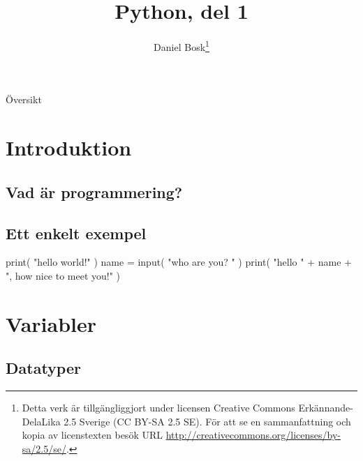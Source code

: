 \documentclass{beamer}
\title{%
  Python, del 1
}
\author{Daniel Bosk\footnote{%
  \tiny
  Detta verk är tillgängliggjort under licensen Creative Commons 
  Erkännande-DelaLika 2.5 Sverige (CC BY-SA 2.5 SE).
  För att se en sammanfattning och kopia av licenstexten besök URL 
  \url{http://creativecommons.org/licenses/by-sa/2.5/se/}.
}}
\institute[MIUN IKS]{%
  Avdelningen för informations- och kommunikationssytem (IKS),\\
  Mittuniversitetet, Sundsvall.
}
\date{\svnId}
\begin{document}
\begin{frame}
  \titlepage
\end{frame}

\begin{frame}{Översikt}
  \tableofcontents
\end{frame}

%  





\section{Introduktion}

\subsection{Vad är programmering?}

\begin{frame}{\insertsubsectionhead}
\end{frame}

\subsection{Ett enkelt exempel}

\begin{frame}{\insertsubsectionhead}
  \begin{src}[language=python]
print( "hello world!" )
name = input( "who are you? " )
print( "hello " + name + ", how nice to meet you!" )
  \end{src}
\end{frame}


\section{Variabler}

\subsection{Datatyper}
\end{document}

